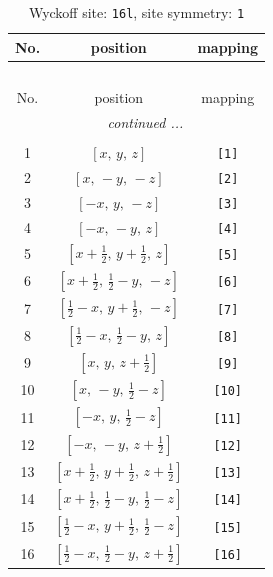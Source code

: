 \documentclass[fleqn,8pt]{jsarticle}
\begin{document}
\begin{longtable}{ccc}
\caption{Wyckoff site: {\tt 16l}, site symmetry: {\tt 1}}
 \\
 \hline \hline
No. & position & mapping \\ \hline \endfirsthead

\multicolumn{2}{l}{\tablename\ \thetable{}} \\
 \hline \hline
No. & position & mapping \\ \hline \endhead

 \hline \hline
\multicolumn{2}{r}{\footnotesize\it continued ...} \\ \endfoot

 \hline \hline
\multicolumn{2}{r}{} \\ \endlastfoot

1 & $\left[ x,\, y,\, z \right]$ & {\tt [1]} \\ \hline
2 & $\left[ x,\, - y,\, - z \right]$ & {\tt [2]} \\ \hline
3 & $\left[ - x,\, y,\, - z \right]$ & {\tt [3]} \\ \hline
4 & $\left[ - x,\, - y,\, z \right]$ & {\tt [4]} \\ \hline
5 & $\left[ x + \frac{1}{2},\, y + \frac{1}{2},\, z \right]$ & {\tt [5]} \\ \hline
6 & $\left[ x + \frac{1}{2},\, \frac{1}{2} - y,\, - z \right]$ & {\tt [6]} \\ \hline
7 & $\left[ \frac{1}{2} - x,\, y + \frac{1}{2},\, - z \right]$ & {\tt [7]} \\ \hline
8 & $\left[ \frac{1}{2} - x,\, \frac{1}{2} - y,\, z \right]$ & {\tt [8]} \\ \hline
9 & $\left[ x,\, y,\, z + \frac{1}{2} \right]$ & {\tt [9]} \\ \hline
10 & $\left[ x,\, - y,\, \frac{1}{2} - z \right]$ & {\tt [10]} \\ \hline
11 & $\left[ - x,\, y,\, \frac{1}{2} - z \right]$ & {\tt [11]} \\ \hline
12 & $\left[ - x,\, - y,\, z + \frac{1}{2} \right]$ & {\tt [12]} \\ \hline
13 & $\left[ x + \frac{1}{2},\, y + \frac{1}{2},\, z + \frac{1}{2} \right]$ & {\tt [13]} \\ \hline
14 & $\left[ x + \frac{1}{2},\, \frac{1}{2} - y,\, \frac{1}{2} - z \right]$ & {\tt [14]} \\ \hline
15 & $\left[ \frac{1}{2} - x,\, y + \frac{1}{2},\, \frac{1}{2} - z \right]$ & {\tt [15]} \\ \hline
16 & $\left[ \frac{1}{2} - x,\, \frac{1}{2} - y,\, z + \frac{1}{2} \right]$ & {\tt [16]} \\
\end{longtable}
\end{document}
